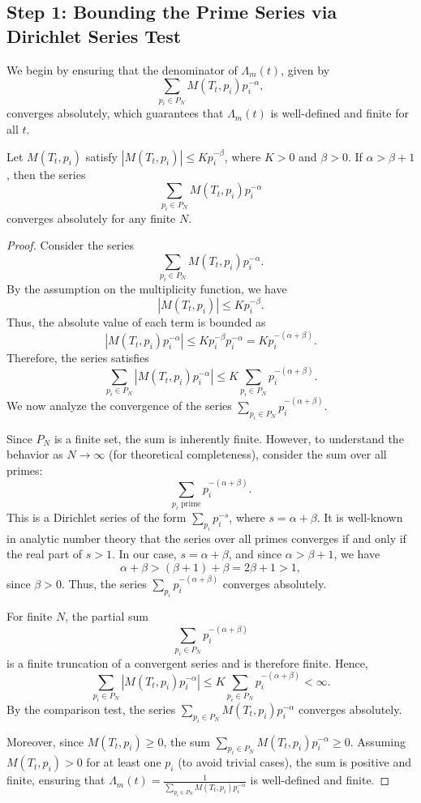 \documentclass{article}
\theoremstyle{plain}
\begin{document}
\subsection{Step 1: Bounding the Prime Series via Dirichlet Series Test}

We begin by ensuring that the denominator of \( \Lambda_m(t) \), given by
\[
\sum_{p_i \in P_N} M(T_t, p_i) p_i^{-\alpha},
\]
converges absolutely, which guarantees that \( \Lambda_m(t) \) is well-defined and finite for all \( t \).

\begin{lemma}
\label{lemma:denominator_convergence}
Let \( M(T_t, p_i) \) satisfy \( |M(T_t, p_i)| \leq K p_i^{-\beta} \), where \( K > 0 \) and \( \beta > 0 \). If \( \alpha > \beta + 1 \), then the series
\[
\sum_{p_i \in P_N} M(T_t, p_i) p_i^{-\alpha}
\]
converges absolutely for any finite \( N \).
\end{lemma}

\begin{proof}
Consider the series
\[
\sum_{p_i \in P_N} M(T_t, p_i) p_i^{-\alpha}.
\]
By the assumption on the multiplicity function, we have
\[
|M(T_t, p_i)| \leq K p_i^{-\beta}.
\]
Thus, the absolute value of each term is bounded as
\[
|M(T_t, p_i) p_i^{-\alpha}| \leq K p_i^{-\beta} p_i^{-\alpha} = K p_i^{-(\alpha + \beta)}.
\]
Therefore, the series satisfies
\[
\sum_{p_i \in P_N} |M(T_t, p_i) p_i^{-\alpha}| \leq K \sum_{p_i \in P_N} p_i^{-(\alpha + \beta)}.
\]
We now analyze the convergence of the series \( \sum_{p_i \in P_N} p_i^{-(\alpha + \beta)} \).

Since \( P_N \) is a finite set, the sum is inherently finite. However, to understand the behavior as \( N \to \infty \) (for theoretical completeness), consider the sum over all primes:
\[
\sum_{p_i \text{ prime}} p_i^{-(\alpha + \beta)}.
\]
This is a Dirichlet series of the form \( \sum_{p_i} p_i^{-s} \), where \( s = \alpha + \beta \). It is well-known in analytic number theory that the series over all primes converges if and only if the real part of \( s > 1 \). In our case, \( s = \alpha + \beta \), and since \( \alpha > \beta + 1 \), we have
\[
\alpha + \beta > (\beta + 1) + \beta = 2\beta + 1 > 1,
\]
since \( \beta > 0 \). Thus, the series \( \sum_{p_i} p_i^{-(\alpha + \beta)} \) converges absolutely.

For finite \( N \), the partial sum
\[
\sum_{p_i \in P_N} p_i^{-(\alpha + \beta)}
\]
is a finite truncation of a convergent series and is therefore finite. Hence,
\[
\sum_{p_i \in P_N} |M(T_t, p_i) p_i^{-\alpha}| \leq K \sum_{p_i \in P_N} p_i^{-(\alpha + \beta)} < \infty.
\]
By the comparison test, the series \( \sum_{p_i \in P_N} M(T_t, p_i) p_i^{-\alpha} \) converges absolutely.

Moreover, since \( M(T_t, p_i) \geq 0 \), the sum \( \sum_{p_i \in P_N} M(T_t, p_i) p_i^{-\alpha} \geq 0 \). Assuming \( M(T_t, p_i) > 0 \) for at least one \( p_i \) (to avoid trivial cases), the sum is positive and finite, ensuring that \( \Lambda_m(t) = \frac{1}{\sum_{p_i \in P_N} M(T_t, p_i) p_i^{-\alpha}} \) is well-defined and finite.
\end{proof}
\end{document}
